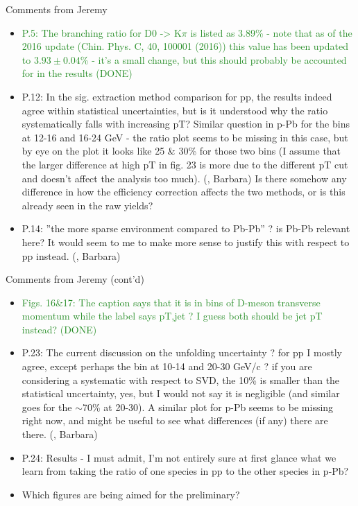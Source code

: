 \documentclass[xcolor={usenames,dvipsnames}]{beamer}
\begin{document}
\begin{frame}{Comments from Jeremy}

{\footnotesize
\begin{itemize}
\item \textcolor{ForestGreen}{P.5: The branching ratio for D0 -> K$\pi$ is listed as 3.89\% - note that as of the 2016 update (Chin. Phys. C, 40, 100001 (2016)) this value has been updated to $3.93\pm0.04$\% - it's a small change, but this should probably be accounted for in the results (DONE)}

\item \textcolor{BrickRed}{P.12: In the sig. extraction method comparison for pp, the results indeed agree within statistical uncertainties, but is it understood why the ratio systematically falls with increasing pT?} \textcolor{NavyBlue}{Similar question in p-Pb for the bins at 12-16 and 16-24 GeV - the ratio plot  seems to be missing in this case, but by eye on the plot it looks like 25 \& 30\% for those two bins (I assume that the larger difference at high pT in fig. 23 is more due to the different pT cut and doesn't affect the analysis too much).  (\pPb, Barbara)} \textcolor{BrickRed}{Is there somehow any difference in how the efficiency correction affects the two methods, or is this already seen in the raw yields?}

\item \textcolor{NavyBlue}{P.14: ''the more sparse environment compared to Pb-Pb'' ? is Pb-Pb relevant here? It would seem to me to make more sense to justify this with respect to pp instead. (\pPb, Barbara)}
\end{itemize}
}
\end{frame}

\begin{frame}{Comments from Jeremy (cont'd)}

{\footnotesize
\begin{itemize}
\item \textcolor{ForestGreen}{Figs. 16\&17: The caption says that it is in bins of D-meson transverse momentum while the label says pT,jet ? I guess both should be jet pT instead? (DONE)}

\item \textcolor{BrickRed}{P.23: The current discussion on the unfolding uncertainty ? for pp I mostly agree, except perhaps the bin at 10-14 and 20-30 GeV/c ? if you are considering a systematic with respect to SVD, the 10\% is smaller than the statistical uncertainty, yes, but I would not say it is negligible (and similar goes for the $\sim$70\% at 20-30)}. \textcolor{NavyBlue}{A similar plot for p-Pb seems to be missing right now, and might be useful to see what differences (if any) there are there. (\pPb, Barbara)}

\item \textcolor{BrickRed}{P.24: Results - I must admit, I'm not entirely sure at first glance what we learn from taking the ratio of one species in pp to the other species in p-Pb?}

\item \textcolor{BrickRed}{Which figures are being aimed for the preliminary?}
\end{itemize}
}
\end{frame}
\end{document}
